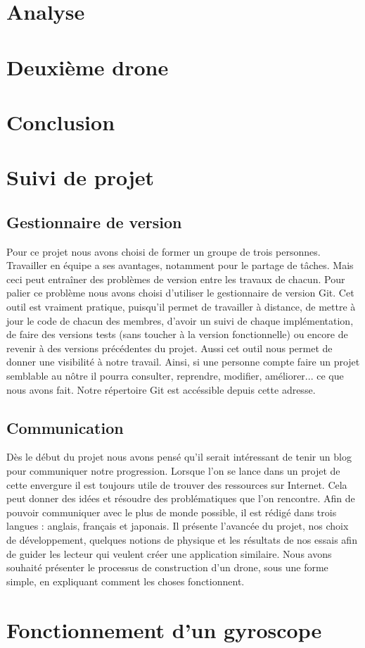 \documentclass[a4paper,10pt]{report}
\begin{document}
  \chapter{Analyse}
  
  \chapter{Deuxième drone}
  
  \chapter{Conclusion}
  
  \appendix
    \chapter{Suivi de projet}
      \section{Gestionnaire de version}
	Pour ce projet nous avons choisi de former un groupe de trois 
personnes. Travailler en équipe a ses avantages, notamment pour le partage de 
tâches. Mais ceci peut entraîner des   problèmes de version entre les travaux de 
chacun. Pour palier ce problème nous avons choisi d'utiliser le gestionnaire 
de version Git. Cet outil est vraiment pratique, puisqu'il permet de travailler 
à distance, de mettre à jour le code de chacun des membres, d'avoir un suivi de 
chaque implémentation, de faire des versions tests (sans toucher à la version 
fonctionnelle) ou encore de revenir à des versions précédentes du projet. Aussi 
cet outil nous permet de donner une visibilité à notre travail. Ainsi, si une 
personne compte faire un projet semblable au nôtre il pourra consulter, 
reprendre, modifier, améliorer... ce que nous avons fait. Notre répertoire Git 
est accéssible depuis cette adresse\cite{njordgit}.
	
      \section{Communication}
	Dès le début du projet nous avons pensé qu'il serait intéressant de 
tenir un blog\cite{njordblog} pour communiquer notre progression. Lorsque l'on 
se lance dans un projet de cette envergure il est toujours utile de trouver 
des ressources sur Internet. Cela peut donner des idées et résoudre des 
problématiques que l'on rencontre. Afin de pouvoir communiquer avec le plus de 
monde possible, il est rédigé dans trois langues : anglais, français et 
japonais. Il présente l'avancée du projet, nos choix de développement, quelques 
notions de physique et les résultats de nos essais afin de guider les lecteur 
qui veulent créer une application similaire. Nous avons souhaité présenter le 
processus de construction d'un drone, sous une forme simple, en expliquant 
comment les choses fonctionnent.
	
    \chapter{Fonctionnement d'un gyroscope}

  \listoffigures
  
  \raggedright
  
  
\end{document}
